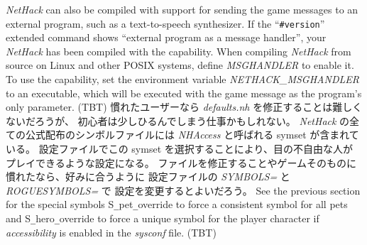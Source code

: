 {\it NetHack\/} can also be compiled with support for sending the game messages
to an external program, such as a text-to-speech synthesizer. If the
``{\tt \#version}'' extended command shows ``external program as a
message handler'', your {\it NetHack\/}
has been compiled with the capability. When compiling {\it NetHack\/}
from source
on Linux and other POSIX systems, define {\it MSGHANDLER\/} to enable it.
To use
the capability, set the environment variable {\it NETHACK\_MSGHANDLER\/} to an
executable, which will be executed with the game message as the program's
only parameter.
(TBT)
慣れたユーザーなら {\it defaults.nh\/} を修正することは難しくないだろうが、
初心者は少しひるんでしまう仕事かもしれない。
{\it NetHack\/} の全ての公式配布のシンボルファイルには
{\it NHAccess\/} と呼ばれる symset が含まれている。
設定ファイルでこの symset を選択することにより、目の不自由な人が
プレイできるような設定になる。
ファイルを修正することやゲームそのものに慣れたなら、好みに合うように
設定ファイルの {\it SYMBOLS=\/} と {\it ROGUESYMBOLS=\/} で
設定を変更するとよいだろう。
See the previous section for the special symbols S\verb+_+pet\verb+_+override
to force a consistent symbol for all pets and S\verb+_+hero\verb+_+override
to force a unique symbol for the player character if {\it accessibility\/}
is enabled in the {\it sysconf\/} file.
(TBT)


